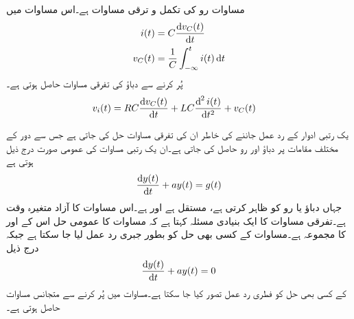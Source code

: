 مساوات  رو   کی تکمل و ترقی مساوات ہے۔اس مساوات میں 
\begin{align*}
i(t)&=C\frac{\dif v_C(t)}{\dif t}\\
v_C(t)&=\frac{1}{C}\int_{-\infty}^{t} i(t)\dif t
\end{align*}
پُر کرنے سے دباؤ  کی تفرقی مساوات حاصل ہوتی ہے۔
\begin{align}\label{مساوات_عارضی_تکمل_و_تفرقی_ب}
v_i(t)&=R C\frac{\dif v_C(t)}{\dif t}+LC\frac{\dif^{\,2} i(t)}{\dif t^2}+v_C(t)
\end{align}

یک رتبی ادوار کے رد عمل جاننے کی خاطر ان کی تفرقی مساوات حل کی جاتی ہے جس سے دور کے مختلف مقامات پر دباؤ اور رو حاصل کی جاتی ہے۔ان یک رتبی مساوات کی عمومی صورت درج ذیل ہوتی ہے
\begin{align}\label{مساوات_عارضی_یک_درجی_عمومی_مساوات}
\frac{\dif y(t)}{\dif t}+a y(t)= g(t)
\end{align}
جہاں  دباؤ یا رو کو ظاہر کرتی ہے،  مستقل ہے اور   ہے۔اس مساوات کا آزاد متغیرہ وقت  ہے۔تفرقی مساوات کا ایک بنیادی مسئلہ کہتا ہے کہ مساوات  کا عمومی حل اس کے   اور   کا مجموعہ ہے۔مساوات  کے کسی بھی حل کو بطور جبری رد عمل لیا جا سکتا ہے جبکہ درج ذیل 
\begin{align}\label{مساوات_عارضی_یک_درجی_عمومی_مساوات_ب}
\frac{\dif y(t)}{\dif t}+a y(t)=0
\end{align}
 کے کسی بھی حل کو فطری رد عمل تصور کیا جا سکتا ہے۔مساوات  میں  پُر کرنے سے متجانس مساوات  حاصل ہوتی ہے۔

